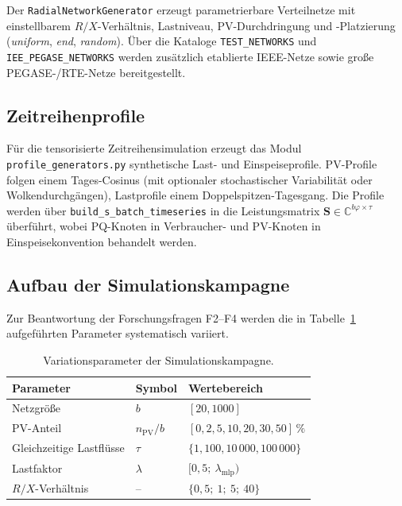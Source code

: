 Der \texttt{RadialNetworkGenerator} erzeugt
parametrierbare Verteilnetze mit einstellbarem $R/X$-Verhältnis, Lastniveau,
PV-Durchdringung und -Platzierung (\emph{uniform}, \emph{end}, \emph{random}). Über die
Kataloge \texttt{TEST\_NETWORKS} und \texttt{IEE\_PEGASE\_NETWORKS} werden zusätzlich
etablierte IEEE-Netze sowie große PEGASE-/RTE-Netze bereitgestellt.

\subsection{Zeitreihenprofile}

Für die tensorisierte Zeitreihensimulation erzeugt das Modul
\texttt{profile\_generators.py} synthetische Last- und Einspeiseprofile. PV-Profile
folgen einem Tages-Cosinus (mit optionaler stochastischer Variabilität oder
Wolkendurchgängen), Lastprofile einem Doppelspitzen-Tagesgang. Die Profile werden über
\texttt{build\_s\_batch\_timeseries} in die Leistungsmatrix
$\mathbf{S}\in\mathbb{C}^{b\varphi \times \tau}$ überführt, wobei PQ-Knoten in
Verbraucher- und PV-Knoten in Einspeisekonvention behandelt werden.

\subsection{Aufbau der Simulationskampagne}

Zur Beantwortung der Forschungsfragen F2--F4 werden die in
Tabelle~\ref{tab:variationsparameter} aufgeführten Parameter systematisch variiert.

\begin{table}[htbp]
	\centering
	\caption{Variationsparameter der Simulationskampagne.}
	\label{tab:variationsparameter}
	\begin{tabular}{lll}
		\toprule
		\textbf{Parameter} & \textbf{Symbol} & \textbf{Wertebereich} \\
		\midrule
		Netzgröße               & $b$          & $[20, 1000]$ \\
		PV-Anteil               & $n_{\mathrm{PV}}/b$ & $[0, 2, 5, 10, 20, 30, 50]\,\%$ \\
		Gleichzeitige Lastflüsse & $\tau$      & $\{1, 100, 10\,000, 100\,000\}$ \\
		Lastfaktor              & $\lambda$    & $[0{,}5;\ \lambda_{\mathrm{mlp}})$ \\
		$R/X$-Verhältnis        & --           & $\{0{,}5;\ 1;\ 5;\ 40\}$ \\
		\bottomrule
	\end{tabular}
\end{table}

